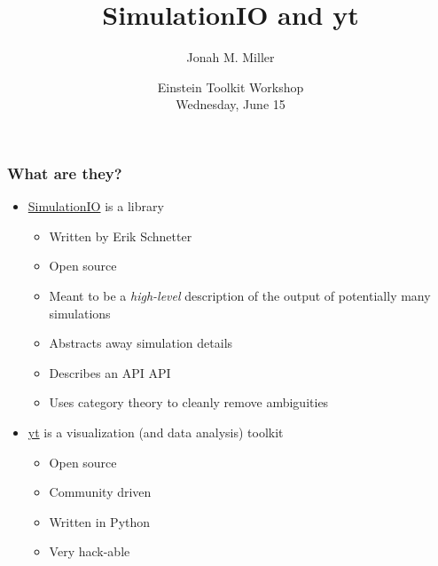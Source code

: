 \documentclass[]{beamer}
\title[SIO \& yt]{SimulationIO and yt}
\author[J. Miller]{Jonah M. Miller}
\institute[PI]{\color{blue}Perimeter Institute for Theoretical Physics}
\date[ET Workshop]{\color{black}Einstein Toolkit Workshop\\Wednesday, June 15}
\begin{document}
\begin{frame}[plain]
\titlepage
\end{frame}

\begin{frame}
  \frametitle{What are they?}
  \begin{itemize}
  \item {\color{blue}\href{https://github.com/eschnett/SimulationIO}{SimulationIO}} is a library
    \begin{itemize}
    \item Written by Erik Schnetter
    \item Open source
    \item Meant to be a \textit{high-level} description of the output of
      potentially many simulations
    \item Abstracts away simulation details
    \item Describes an API API
    \item Uses category theory to cleanly remove ambiguities
    \end{itemize}
  \item {\color{blue}\href{http://yt-project.org/}{yt}} is a
    visualization (and data analysis) toolkit
    \begin{itemize}
    \item Open source
    \item Community driven
    \item Written in Python
    \item Very hack-able
    \end{itemize}
  \end{itemize}
\end{frame}
\end{document}
